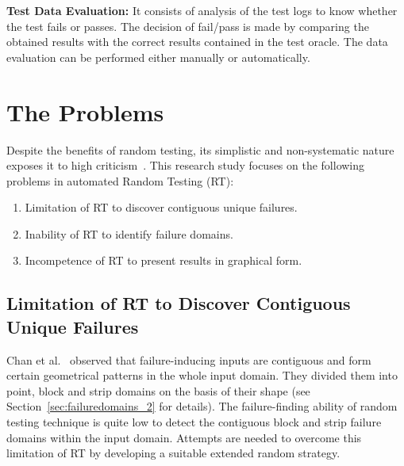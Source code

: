 \textbf{Test Data Evaluation:} It consists of analysis of the test logs to know whether the test fails or passes. The decision of fail/pass is made by comparing the obtained results with the correct results contained in the test oracle. The data evaluation can be performed either manually or automatically.

%

\section{The Problems}
Despite the benefits of random testing, its simplistic and non-systematic nature exposes it to high criticism~\cite{myers2011art, white1987software}. This research study focuses on the following problems in automated Random Testing (RT):


\begin{enumerate}
\item Limitation of RT to discover contiguous unique failures.
\item Inability of RT to identify failure domains.
\item Incompetence of RT to present results in graphical form. 
\end{enumerate}

\subsection{Limitation of RT to Discover Contiguous Unique Failures}
Chan et al.~\cite{chan1996proportional} observed that failure-inducing inputs are contiguous and form certain geometrical patterns in the whole input domain. They divided them into point, block and strip domains on the basis of their shape (see Section~\ref{sec:failuredomains_2} for details). %
The failure-finding ability of random testing technique is quite low to detect the contiguous block and strip failure domains within the input domain. Attempts are needed to overcome this limitation of RT by developing a suitable extended random strategy.

